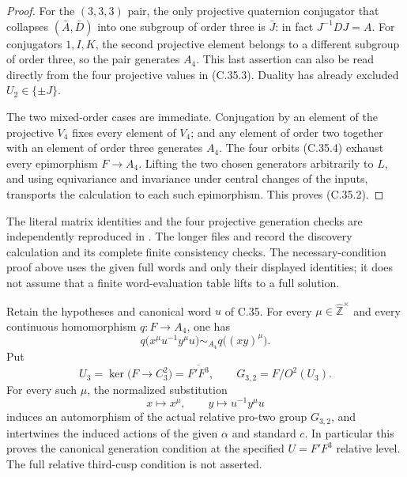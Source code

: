 \begin{proof}
For the \((3,3,3)\) pair, the only projective quaternion
conjugator that collapses \((\bar A,\bar D)\) into one
subgroup of order three is \(\bar J\): in fact
\(J^{-1}DJ=A\). For conjugators \(1,I,K\), the second
projective element belongs to a different subgroup of order
three, so the pair generates \(A_4\). This last assertion
can also be read directly from the four projective values in
(C.35.3). Duality has already excluded \(U_2\in\{\pm J\}\).

The two mixed-order cases are immediate. Conjugation by an
element of the projective \(V_4\) fixes every element of
\(V_4\); and any element of order two together with an
element of order three generates \(A_4\). The four orbits
(C.35.4) exhaust every epimorphism \(F\to A_4\).
Lifting the two chosen generators arbitrarily to \(L\), and
using equivariance and invariance under central changes of the
inputs, transports the calculation to each such epimorphism.
This proves (C.35.2).
\end{proof}

The literal matrix identities and the four projective generation
checks are independently reproduced in
.
The longer files  and
 record the discovery
calculation and its complete finite consistency checks. The
necessary-condition proof above uses the given full words and
only their displayed identities; it does not assume that a
finite word-evaluation table lifts to a full solution.

Retain the hypotheses and canonical word \(u\) of C.35. For every
\(\mu\in\widehat{\mathbb Z}^{\times}\) and every continuous
homomorphism \(q:F\to A_4\), one has
\[
 q\bigl(x^\mu u^{-1}y^\mu u\bigr)
                  \sim_{A_4}q\bigl((xy)^\mu\bigr).
 \tag{C.36.1}
\]
Put
\[
 U_3=\ker\bigl(F\to C_3^2\bigr)=\overline{F'F^3},\qquad
                      G_{3,2}=F/O^2(U_3).
 \tag{C.36.2}
\]
For every such \(\mu\), the normalized substitution
\[
                   x\longmapsto x^\mu,\qquad
                   y\longmapsto u^{-1}y^\mu u
 \tag{C.36.3}
\]
induces an automorphism of the actual relative pro-two group
\(G_{3,2}\), and intertwines the induced actions of the given
\(\alpha\) and standard \(c\). In particular this proves
the canonical generation condition at the specified
\(U=F'F^3\) relative level. The full relative third-cusp
condition is not asserted.

